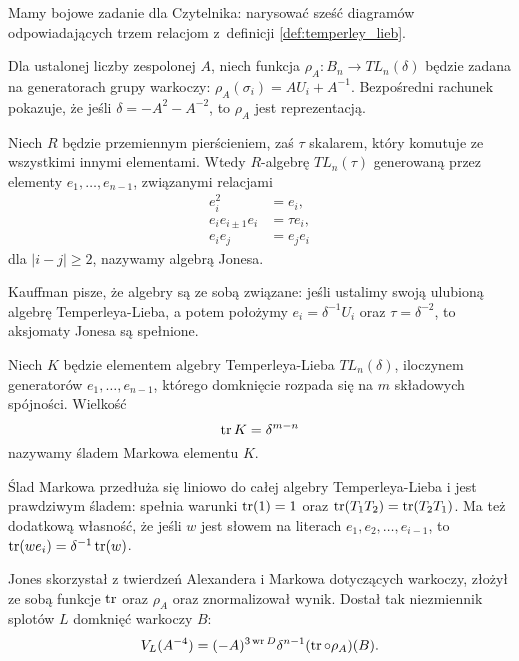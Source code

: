 Mamy bojowe zadanie dla Czytelnika: narysować sześć diagramów odpowiadających trzem relacjom z~definicji \ref{def:temperley_lieb}.

Dla ustalonej liczby zespolonej $A$, niech funkcja $\rho_A \colon B_n \to TL_n(\delta)$ będzie zadana na generatorach grupy warkoczy: $\rho_A(\sigma_i) = AU_i + A^{-1}$.
Bezpośredni rachunek pokazuje, że jeśli $\delta = -A^2-A^{-2}$, to $\rho_A$ jest reprezentacją.

\begin{definition}
%
    Niech $R$ będzie przemiennym pierścieniem, zaś $\tau$ skalarem, który komutuje ze wszystkimi innymi elementami.
    Wtedy $R$-algebrę $TL_n(\tau)$ generowaną przez elementy $e_1, \ldots, e_{n-1}$, związanymi relacjami
    \begin{align}
        e_i^2 & = e_i, \\
        e_i e_{i \pm 1} e_i & = \tau e_i, \\
        e_i e_j & = e_j e_i
    \end{align}
    dla $|i-j| \ge 2$, nazywamy algebrą Jonesa.
\end{definition}

Kauffman pisze, że algebry są ze sobą związane: jeśli ustalimy swoją ulubioną algebrę Temperleya-Lieba, a potem położymy $e_i = \delta^{-1} U_i$ oraz $\tau = \delta^{-2}$, to aksjomaty Jonesa są spełnione.

\begin{definition}
%
    Niech $K$ będzie elementem algebry Temperleya-Lieba $TL_n(\delta)$, iloczynem generatorów $e_1, \ldots, e_{n-1}$, którego domknięcie rozpada się na $m$ składowych spójności.
    Wielkość
    \begin{equation}
        \operatorname{tr} K = \delta^{m-n}
    \end{equation}
    nazywamy śladem Markowa elementu $K$.
\end{definition}

Ślad Markowa przedłuża się liniowo do całej algebry Temperleya-Lieba i jest prawdziwym śladem: spełnia warunki $\operatorname{tr} (1) = 1$ oraz $\operatorname{tr} (T_1T_2) = \operatorname{tr} (T_2T_1)$.
Ma też dodatkową własność, że jeśli $w$ jest słowem na literach $e_1, e_2, \ldots, e_{i-1}$, to $\operatorname{tr}(we_i) = \delta^{-1} \operatorname{tr} (w)$.

Jones skorzystał z twierdzeń Alexandera i Markowa dotyczących warkoczy, złożył ze sobą funkcje $\operatorname{tr}$ oraz $\rho_A$ oraz znormalizował wynik.
%
%
Dostał tak niezmiennik splotów $L$ domknięć warkoczy $B$:
\begin{equation}
    V_L(A^{-4}) = (-A)^{3 \operatorname{wr} D} \delta^{n-1} (\operatorname{tr} \circ \rho_A)(B).
\end{equation}


